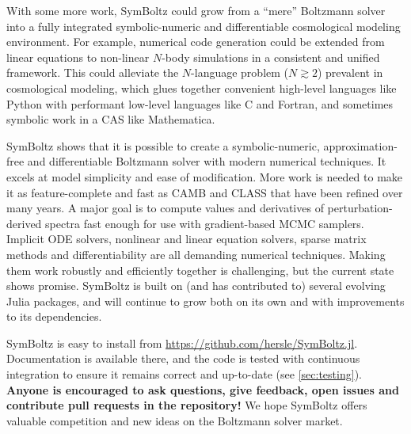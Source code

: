\documentclass{aa}
\begin{document}
With some more work, SymBoltz could grow from a \enquote{mere} Boltzmann solver into a fully integrated symbolic-numeric and differentiable cosmological modeling environment.
For example, numerical code generation could be extended from linear equations to non-linear $N$-body simulations in a consistent and unified framework. %
This could alleviate the $N$-language problem ($N \gtrsim 2$) prevalent in cosmological modeling, which glues together convenient high-level languages like Python with performant low-level languages like C and Fortran, and sometimes symbolic work in a CAS like Mathematica.


SymBoltz shows that it is possible to create a symbolic-numeric, approximation-free and differentiable Boltzmann solver with modern numerical techniques.
It excels at model simplicity and ease of modification.
More work is needed to make it as feature-complete and fast as CAMB and CLASS that have been refined over many years.
A major goal is to compute values and derivatives of perturbation-derived spectra fast enough for use with gradient-based MCMC samplers.
Implicit ODE solvers, nonlinear and linear equation solvers, sparse matrix methods and differentiability are all demanding numerical techniques.
Making them work robustly and efficiently together is challenging, but the current state shows promise.
SymBoltz is built on (and has contributed to) several evolving Julia packages, and will continue to grow both on its own and with improvements to its dependencies.

SymBoltz is easy to install from \url{https://github.com/hersle/SymBoltz.jl}.
Documentation is available there, and the code is tested with continuous integration to ensure it remains correct and up-to-date (see \cref{sec:testing}).
\textbf{Anyone is encouraged to ask questions, give feedback, open issues and contribute pull requests in the repository!}
We hope SymBoltz offers valuable competition and new ideas on the Boltzmann solver market.
\end{document}
